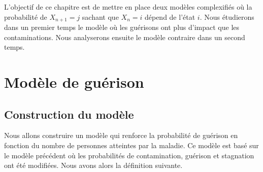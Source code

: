 \documentclass[12pt,a4paper]{report}
\theoremstyle{remark}
\begin{document}
L'objectif de ce chapitre est de mettre en place deux modèles complexifiés où la probabilité de $X_{n+1} = j$ sachant que $X_n = i$ dépend de l'état $i$. Nous étudierons dans un premier temps le modèle où les guérisons ont plus d'impact que les contaminations. Nous analyserons ensuite le modèle contraire dans un second temps.

\section{Modèle de guérison}
\subsection{Construction du modèle}
\vspace{0.6cm}

Nous allons construire un modèle qui renforce la probabilité de guérison en fonction du nombre de personnes atteintes par la maladie. Ce modèle est basé sur le modèle précédent où les probabilités de contamination, guérison et stagnation ont été modifiées. Nous avons alors la définition suivante.
\\
\end{document}
